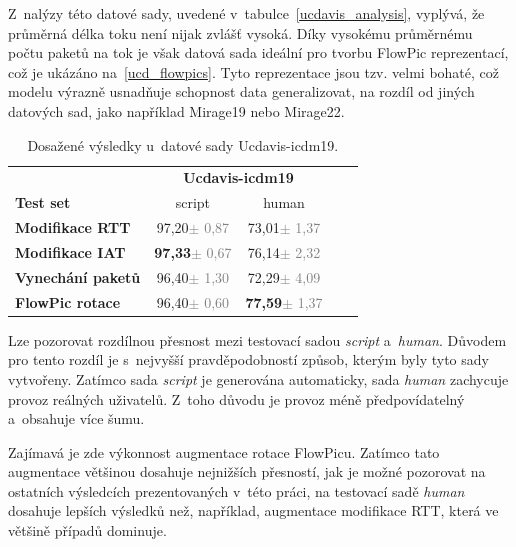 Z~nalýzy této datové sady, uvedené v~tabulce~\ref{ucdavis_analysis}, vyplývá, že průměrná délka toku není nijak zvlášť vysoká. Díky vysokému průměrnému počtu paketů na tok je však datová sada ideální pro tvorbu FlowPic reprezentací, což je ukázáno na~\ref{ucd_flowpics}. Tyto reprezentace jsou tzv. velmi bohaté, což modelu výrazně usnadňuje schopnost data generalizovat, na rozdíl od jiných datových sad, jako například Mirage19 nebo Mirage22.

\begin{table}[H]
    \centering
    \begin{tabular}{lcccc}
        \toprule
          & \multicolumn{2}{c}{\textbf{Ucdavis-icdm19}} \\
          \cmidrule(lr){2-3}
         \textbf{Test set} & script & human \\
        \midrule
        \textbf{Modifikace RTT} & 97,20{\tiny\textcolor{gray}{$\pm$ 0,87}} & 73,01{\tiny\textcolor{gray}{$\pm$ 1,37}}\\
        \textbf{Modifikace IAT} & \textbf{97,33}{\tiny\textcolor{gray}{$\pm$ 0,67}} & 76,14{\tiny\textcolor{gray}{$\pm$ 2,32}} \\
        \textbf{Vynechání paketů} & 96,40{\tiny\textcolor{gray}{$\pm$ 1,30}} & 72,29{\tiny\textcolor{gray}{$\pm$ 4,09}} \\
        \textbf{FlowPic rotace} & 96,40{\tiny\textcolor{gray}{$\pm$ 0,60}} & \textbf{77,59}{\tiny\textcolor{gray}{$\pm$ 1,37}} \\
        \bottomrule
    \end{tabular}
    \caption{Dosažené výsledky u~datové sady Ucdavis-icdm19.}
\end{table}

Lze pozorovat rozdílnou přesnost mezi testovací sadou \textit{script} a~\textit{human}. Důvodem pro tento rozdíl je s~nejvyšší pravděpodobností způsob, kterým byly tyto sady vytvořeny. Zatímco sada \textit{script} je generována automaticky, sada \textit{human} zachycuje provoz reálných uživatelů. Z~toho důvodu je provoz méně předpovídatelný a~obsahuje více šumu. 

Zajímavá je zde výkonnost augmentace rotace FlowPicu. Zatímco tato augmentace většinou dosahuje nejnižších přesností, jak je možné pozorovat na ostatních výsledcích prezentovaných v~této práci, na testovací sadě \textit{human} dosahuje lepších výsledků než, například, augmentace modifikace RTT, která ve většině případů dominuje.

